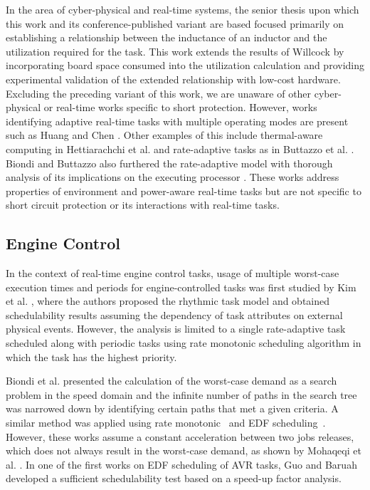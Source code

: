 In the area of cyber-physical and real-time systems, the senior thesis \cite{willcock_short_2016} upon which this work and its conference-published variant \cite{willcock_trading_2017} are based focused primarily on establishing a relationship between the inductance of an inductor and the utilization required for the task.
This work extends the results of Willcock \cite{willcock_short_2016} by incorporating board space consumed into the utilization calculation and providing experimental validation of the extended relationship with low-cost hardware.
Excluding the preceding variant of this work, we are unaware of other cyber-physical or real-time works specific to short protection.
However, works identifying adaptive real-time tasks with multiple operating modes are present such as Huang and Chen \cite{huang_techniques_2015}.
Other examples of this include thermal-aware computing in Hettiarachchi et al. \cite{hettiarachchi_design_2014} and rate-adaptive tasks as in Buttazzo et al. \cite{buttazzo_rate-adaptive_2014}.
Biondi and Buttazzo also furthered the rate-adaptive model with thorough analysis of its implications on the executing processor \cite{biondi_engine_2015}.
These works address properties of environment and power-aware real-time tasks but are not specific to short circuit protection or its interactions with real-time tasks.

\subsection{Engine Control} \label{subsec:engCtrl-relatedWork}

In the context of real-time engine control tasks, usage of multiple worst-case execution times and periods for engine-controlled tasks was first studied by Kim et al. \cite{kim_rhythmic_2012}, where the authors proposed the rhythmic task model and obtained schedulability results assuming the dependency of task attributes on external physical events.
However, the analysis is limited to a single rate-adaptive task scheduled along with periodic tasks using rate monotonic scheduling algorithm in which the task has the highest priority.

Biondi et al. \cite{biondi_exact_2014} presented the calculation of the worst-case demand as a search problem in the speed domain and the infinite number of paths in the search tree was narrowed down by identifying certain paths that met a given criteria.
A similar method was applied using rate monotonic~\cite{biondi_response-time_2015} and EDF scheduling~\cite{biondi_feasibility_2015}.
However, these works assume a constant acceleration between two jobs releases, which does not always result in the worst-case demand, as shown by Mohaqeqi et al. \cite{mohaqeqi_refinement_2017}.
In one of the first works on EDF scheduling of AVR tasks, Guo and Baruah~\cite{guo_uniprocessor_2015} developed a sufficient schedulability test based on a speed-up factor analysis.

